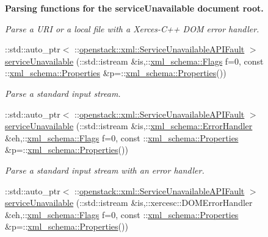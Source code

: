 \begin{Indent}{\bf Parsing functions for the serviceUnavailable document root.}
\begin{DoxyCompactItemize}
\begin{DoxyCompactList}\small\item\em Parse a URI or a local file with a Xerces-\/C++ DOM error handler. \item\end{DoxyCompactList}\item 
::std::auto\_\-ptr$<$ ::\hyperlink{classopenstack_1_1xml_1_1ServiceUnavailableAPIFault}{openstack::xml::ServiceUnavailableAPIFault} $>$ \hyperlink{namespaceopenstack_1_1xml_a640d7036ad796a8699748ee4dbbe3e93}{serviceUnavailable} (::std::istream \&is,::\hyperlink{namespacexml__schema_affb4c227cbd9aa7453dd1dc5a1401943}{xml\_\-schema::Flags} f=0, const ::\hyperlink{namespacexml__schema_ad27ce19a7ee1d3b1064092648898f64c}{xml\_\-schema::Properties} \&p=::\hyperlink{namespacexml__schema_ad27ce19a7ee1d3b1064092648898f64c}{xml\_\-schema::Properties}())
\begin{DoxyCompactList}\small\item\em Parse a standard input stream. \item\end{DoxyCompactList}\item 
::std::auto\_\-ptr$<$ ::\hyperlink{classopenstack_1_1xml_1_1ServiceUnavailableAPIFault}{openstack::xml::ServiceUnavailableAPIFault} $>$ \hyperlink{namespaceopenstack_1_1xml_ac127d7d2e261359982db23cbaa96e1ea}{serviceUnavailable} (::std::istream \&is,::\hyperlink{namespacexml__schema_ab1c9361bfd3b404eaabf0c31eded79dc}{xml\_\-schema::ErrorHandler} \&eh,::\hyperlink{namespacexml__schema_affb4c227cbd9aa7453dd1dc5a1401943}{xml\_\-schema::Flags} f=0, const ::\hyperlink{namespacexml__schema_ad27ce19a7ee1d3b1064092648898f64c}{xml\_\-schema::Properties} \&p=::\hyperlink{namespacexml__schema_ad27ce19a7ee1d3b1064092648898f64c}{xml\_\-schema::Properties}())
\begin{DoxyCompactList}\small\item\em Parse a standard input stream with an error handler. \item\end{DoxyCompactList}\item 
::std::auto\_\-ptr$<$ ::\hyperlink{classopenstack_1_1xml_1_1ServiceUnavailableAPIFault}{openstack::xml::ServiceUnavailableAPIFault} $>$ \hyperlink{namespaceopenstack_1_1xml_a19e1c5b5f06de487d3a037d5e940d790}{serviceUnavailable} (::std::istream \&is,::xercesc::DOMErrorHandler \&eh,::\hyperlink{namespacexml__schema_affb4c227cbd9aa7453dd1dc5a1401943}{xml\_\-schema::Flags} f=0, const ::\hyperlink{namespacexml__schema_ad27ce19a7ee1d3b1064092648898f64c}{xml\_\-schema::Properties} \&p=::\hyperlink{namespacexml__schema_ad27ce19a7ee1d3b1064092648898f64c}{xml\_\-schema::Properties}())

\end{DoxyCompactItemize}
\end{Indent}

